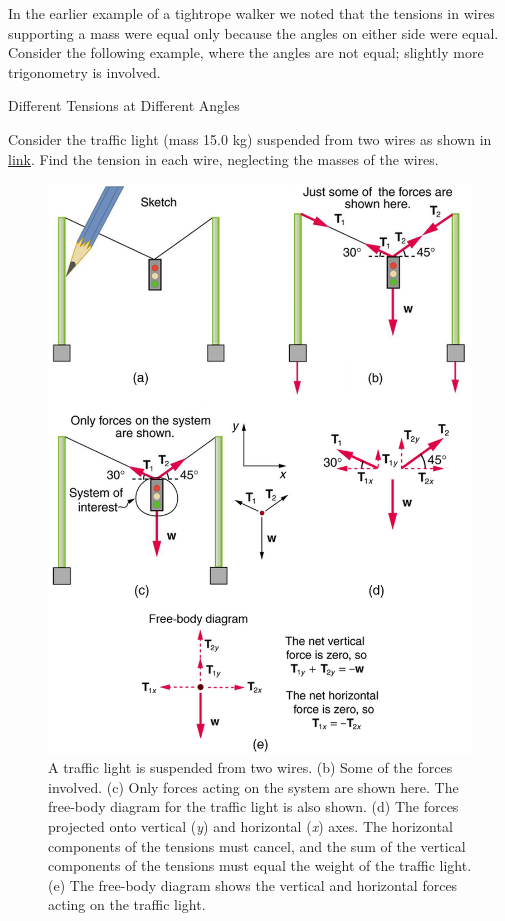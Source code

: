 \documentclass[
]{book}
\begin{document}
In the earlier example of a tightrope walker we noted that the tensions
in wires supporting a mass were equal only because the angles on either
side were equal. Consider the following example, where the angles are
not equal; slightly more trigonometry is involved.

\hypertarget{fs-id1348788}{}
Different Tensions at Different Angles

Consider the traffic light (mass 15.0 kg) suspended from two wires as
shown in \protect\hyperlink{import-auto-id3051538}{link}. Find
the tension in each wire, neglecting the masses of the wires.

\begin{figure}
\hypertarget{import-auto-id3051538}{%
\centering
\includegraphics{images/Figure_04_07_02.jpg}
\caption{A traffic light is suspended from two wires. (b) Some of the forces
involved. (c) Only forces acting on the system are shown here. The
free-body diagram for the traffic light is also shown. (d) The forces
projected onto vertical (\emph{y}) and horizontal (\emph{x}) axes. The horizontal
components of the tensions must cancel, and the sum of the vertical
components of the tensions must equal the weight of the traffic light.
(e) The free-body diagram shows the vertical and horizontal forces
acting on the traffic
light.}\label{import-auto-id3051538}
}
\end{figure}
\end{document}
